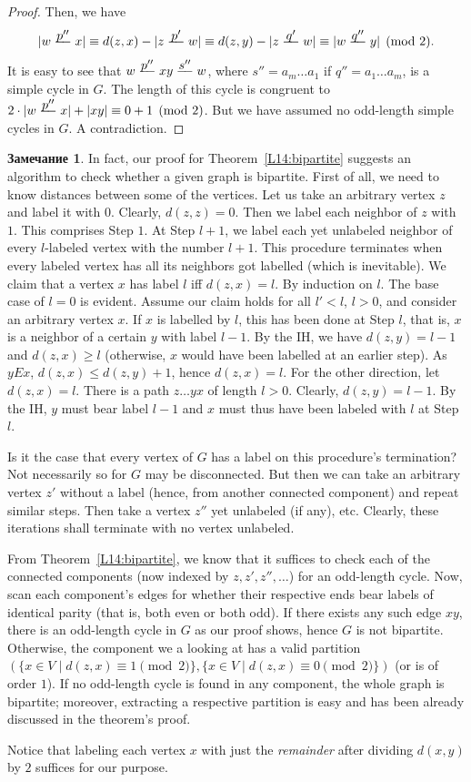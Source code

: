 \documentclass[12pt,notitlepage]{article}
\theoremstyle{plain}
\theoremstyle{definition}
\newtheorem{rem}[thm]{Замечание}
\theoremstyle{plain}
\newcommand{\1}{\mathbf{1}}
\newcommand{\0}{\mathbf{0}}
\newcommand{\pth}[1]{\overset{\raisebox{0.25em}{$ #1 $}}{\relbar\hspace{-.8mm}\relbar}}
\begin{document}
\begin{proof}
	Then, we have
	$$
	|w \pth{p''} x| \equiv d(z,x) - |z \pth{p'} w| \equiv d(z,y) - |z \pth{q'} w| \equiv |w \pth{q''} y| \pmod 2.
	$$
	It is easy to see that $w \pth{p''} x y \pth{s''} w$, where $s'' = a_m \ldots a_1$ if $q'' = a_1 \ldots a_m$, is a simple cycle in $G$. The length of this cycle is congruent to $2 \cdot |w \pth{p''} x| + |x y| \equiv 0 + 1 \pmod 2$. But we have assumed no odd-length simple cycles in $G$. A contradiction.
\end{proof}

\begin{rem}\label{graph:part_algo}
	In fact, our proof for Theorem~\ref{L14:bipartite} suggests an algorithm to check whether a given graph is bipartite. First of all, we need to know distances between some of the vertices. Let us take an arbitrary vertex $z$ and label it with $0$. Clearly, $d(z,z) = 0$. Then we label each neighbor of $z$ with $1$. This comprises Step $1$. At Step $l + 1$, we label each yet unlabeled neighbor of every $l$-labeled vertex with the number $l + 1$. This procedure terminates when every labeled vertex has all its neighbors got labelled (which is inevitable). We claim that a vertex $x$ has label $l$ iff $d(z, x) = l$. By induction on $l$. The base case of $l = 0$ is evident. Assume our claim holds for all $l' < l$, $l > 0$, and consider an arbitrary vertex $x$. If $x$ is labelled by $l$, this has been done at Step $l$, that is, $x$ is a neighbor of a certain $y$ with label $l - 1$. By the IH, we have $d(z,y) = l - 1$ and $d(z, x)\geq l$ (otherwise, $x$ would have been labelled at an earlier step). As $y E x$, $d(z, x) \leq d(z, y) + 1$, hence $d(z, x) = l$. For the other direction, let $d(z,x) = l$. There is a path $z \ldots y x$ of length $l > 0$. Clearly, $d(z,y) = l - 1$. By the IH, $y$ must bear label $l - 1$ and $x$ must thus have been labeled with $l$ at Step $l$.
	
	Is it the case that every vertex of $G$ has a label on this procedure's termination? Not necessarily so for $G$ may be disconnected. But then we can take an arbitrary vertex $z'$ without a label (hence, from another connected component) and repeat similar steps. Then take a vertex $z''$ yet unlabeled (if any), etc. Clearly, these iterations shall terminate with no vertex unlabeled.
	
	From Theorem~\ref{L14:bipartite}, we know that it suffices to check each of the connected components (now indexed by $z, z', z'',\ldots$) for an odd-length cycle. Now, scan each component's edges for whether their respective ends bear labels of identical parity (that is, both even or both odd). If there exists any such edge $xy$, there is an odd-length cycle in $G$ as our proof shows, hence $G$ is not bipartite. Otherwise, the component we a looking at has a valid partition $(\{x \in V \mid d(z,x)\equiv 1 \pmod 2\}, \{x \in V \mid d(z,x)\equiv 0 \pmod 2\})$ (or is of order $1$). If no odd-length cycle is found in any component, the whole graph is bipartite; moreover, extracting a respective partition is easy and has been already discussed in the theorem's proof.
	
	Notice that labeling each vertex $x$ with just the \emph{remainder} after dividing $d(x,y)$ by $2$ suffices for our purpose.
\end{rem}
\end{document}
